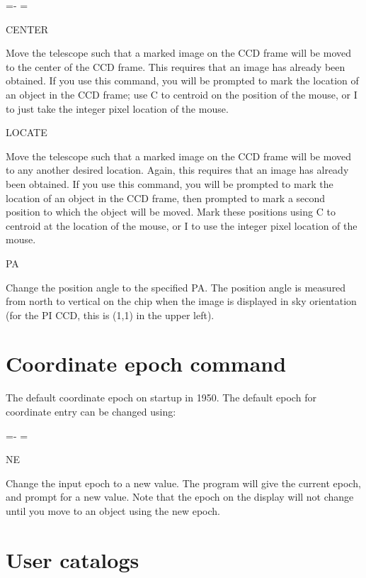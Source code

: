 \documentclass[10pt]{report}
\renewcommand{\[}{\begin{eqnarray}}
\renewcommand{\]}{\end{eqnarray}}
\newenvironment{hanging}{
	\begin{list}{}{
		\labelsep=0pt
		\labelwidth=0pt
		\listparindent=0pt
		\itemindent=-\leftmargini
		\leftmargin=\leftmargini
	}
}{
	\end{list}
}
\begin{document}
\begin{hanging}
\item{CENTER}

Move the telescope such that a marked image on the CCD frame will be
moved to the center of the CCD frame. This requires that an image has
already been obtained. If you use this command, you will be prompted to mark the
location of an object in the CCD frame; use C to centroid on the position
of the mouse, or I to just take the integer pixel location of the mouse.

\item{LOCATE}

Move the telescope such that a marked image on the CCD frame will be
moved to any another desired location. Again, this requires that an image
has already been obtained. If you use this command, you will be prompted
to mark the location of an object in the CCD frame, then prompted to
mark a second position to which the object will be moved. Mark these
positions using C to centroid at the location of the mouse, 
or I to use the integer pixel location of the mouse.

\item{PA}

Change the position angle to the specified PA. The position angle is
measured from north to vertical on the chip when the image is displayed
in sky orientation (for the PI CCD, this is (1,1) in the upper left).

\end{hanging}

\section{Coordinate epoch command}

The default coordinate epoch on startup in 1950. The default epoch for
coordinate entry can be changed using:

\begin{hanging}
\item{NE}

Change the input epoch to a new value. The program will give the current
epoch, and prompt for a new value. Note that the epoch on the display will
not change until you move to an object using the new epoch.
\end{hanging}

\section{User catalogs}
\end{document}
